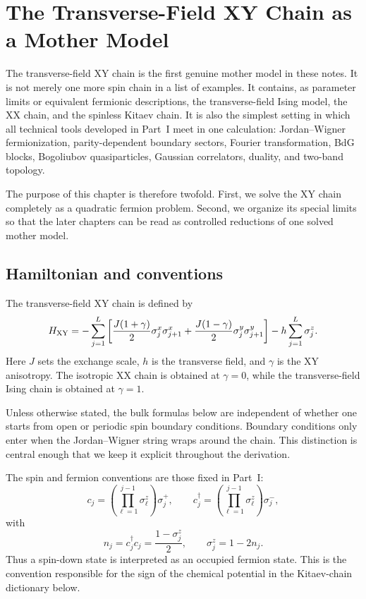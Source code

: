\chapter{The Transverse-Field XY Chain as a Mother Model}
\label{chap:xy-chain-mother-model}

The transverse-field XY chain is the first genuine mother model in these notes.
It is not merely one more spin chain in a list of examples.  It contains, as
parameter limits or equivalent fermionic descriptions, the transverse-field
Ising model, the XX chain, and the spinless Kitaev chain.  It is also the
simplest setting in which all technical tools developed in Part~I meet in one
calculation: Jordan--Wigner fermionization, parity-dependent boundary sectors,
Fourier transformation, BdG blocks, Bogoliubov quasiparticles, Gaussian
correlators, duality, and two-band topology.

The purpose of this chapter is therefore twofold.  First, we solve the XY chain
completely as a quadratic fermion problem.  Second, we organize its special
limits so that the later chapters can be read as controlled reductions of one
solved mother model.

\section{Hamiltonian and conventions}
\label{sec:xy-hamiltonian-conventions}

The transverse-field XY chain is defined by
\begin{equation}
\label{eq:xy-hamiltonian}
    H_{\rm XY}
    =-
    \sum_{j=1}^{L}
    \left[
        \frac{J(1+\gamma)}{2}\sigma_j^x\sigma_{j+1}^x
        +
        \frac{J(1-\gamma)}{2}\sigma_j^y\sigma_{j+1}^y
    \right]
    -h\sum_{j=1}^{L}\sigma_j^z .
\end{equation}
Here $J$ sets the exchange scale, $h$ is the transverse field, and $\gamma$ is the
XY anisotropy.  The isotropic XX chain is obtained at $\gamma=0$, while the
transverse-field Ising chain is obtained at $\gamma=1$.

Unless otherwise stated, the bulk formulas below are independent of whether one
starts from open or periodic spin boundary conditions.  Boundary conditions only
enter when the Jordan--Wigner string wraps around the chain.  This distinction is
central enough that we keep it explicit throughout the derivation.

The spin and fermion conventions are those fixed in Part~I:
\begin{equation}
\label{eq:xy-mother-jw-convention-reminder}
    c_j
    =
    \left(\prod_{\ell=1}^{j-1}\sigma_\ell^z\right)\sigma_j^+,
    \qquad
    c_j^\dagger
    =
    \left(\prod_{\ell=1}^{j-1}\sigma_\ell^z\right)\sigma_j^- ,
\end{equation}
with
\begin{equation}
    n_j=c_j^\dagger c_j=\frac{1-\sigma_j^z}{2},
    \qquad
    \sigma_j^z=1-2n_j.
\end{equation}
Thus a spin-down state is interpreted as an occupied fermion state.  This is the
convention responsible for the sign of the chemical potential in the Kitaev-chain
dictionary below.

